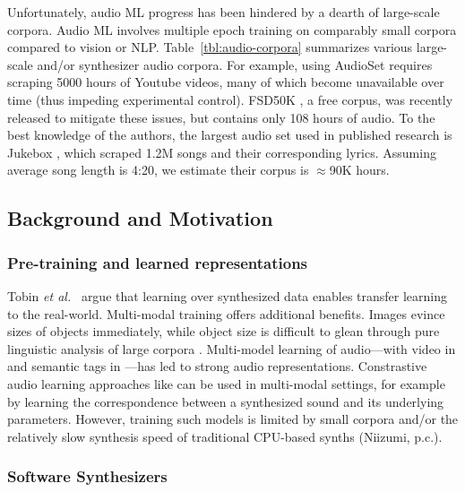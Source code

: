 Unfortunately, audio ML progress has been hindered by a dearth of large-scale corpora. Audio ML involves multiple epoch training on comparably small corpora compared to vision or NLP. Table~\ref{tbl:audio-corpora} summarizes various large-scale and/or synthesizer audio corpora.
For example, using AudioSet \cite{45857} requires scraping 5000 hours of Youtube videos, many of which become unavailable over time (thus impeding experimental control). FSD50K \cite{fonseca2020fsd50k}, a free corpus, was recently released to mitigate these issues, but contains only 108 hours of audio. To the best knowledge of the authors, the largest audio set used in published research is Jukebox \cite{dhariwal2020jukebox}, which scraped 1.2M songs and their corresponding lyrics. Assuming average song length is 4:20, we estimate their corpus is $\approx$90K hours. 



\subsection{Background and Motivation}

\subsubsection{Pre-training and learned representations}

Tobin {\em et al.}~\cite{DBLP:conf/iros/TobinFRSZA17} argue that learning over synthesized data enables transfer learning to the real-world.
Multi-modal training offers additional benefits.
Images evince sizes of objects immediately, while object size is difficult to glean through pure linguistic analysis of large corpora  \cite{DBLP:conf/acl/ElazarMRBR19}.
Multi-model learning of audio---with video in \cite{DBLP:conf/icassp/CramerWSB19} and semantic tags in \cite{drossos:icml:2020}---has led to strong audio representations.
Constrastive audio learning approaches like \cite{saeed2020contrastive} can be used in multi-modal settings, for example by learning the correspondence between a synthesized sound and its underlying parameters.
However, training such models is limited by small corpora and/or the relatively slow synthesis speed of traditional CPU-based synths (Niizumi, p.c.).

\subsubsection{Software Synthesizers}

